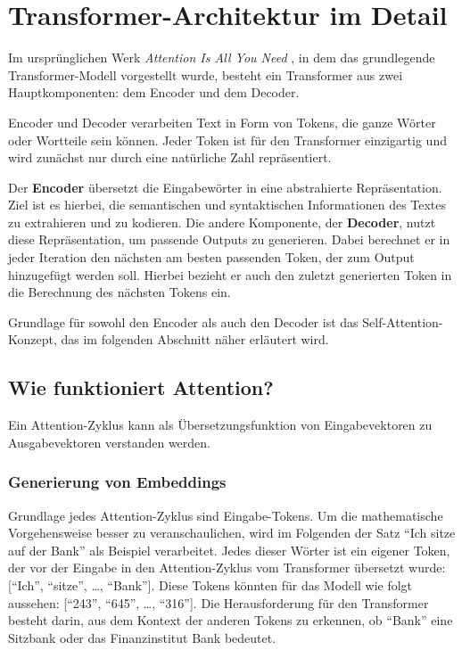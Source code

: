 \chapter{Transformer-Architektur im Detail}

Im ursprünglichen Werk \textit{Attention Is All You Need} , in dem das grundlegende Transformer-Modell vorgestellt wurde, besteht ein Transformer aus zwei Hauptkomponenten: 
dem Encoder und dem Decoder.

Encoder und Decoder verarbeiten Text in Form von Tokens, die ganze Wörter oder Wortteile sein können. 
Jeder Token ist für den Transformer einzigartig und wird zunächst nur durch eine natürliche Zahl repräsentiert.

Der \textbf{Encoder} übersetzt die Eingabewörter in eine abstrahierte Repräsentation.  
Ziel ist es hierbei, die semantischen und syntaktischen Informationen des Textes zu extrahieren und zu kodieren.  
Die andere Komponente, der \textbf{Decoder}, nutzt diese Repräsentation, um passende Outputs zu generieren. 
Dabei berechnet er in jeder Iteration den nächsten am besten passenden Token, der zum Output hinzugefügt werden soll. 
Hierbei bezieht er auch den zuletzt generierten Token in die Berechnung des nächsten Tokens ein.

Grundlage für sowohl den Encoder als auch den Decoder ist das Self-Attention-Konzept, das im folgenden Abschnitt näher erläutert wird.

\section{Wie funktioniert Attention?}

Ein Attention-Zyklus kann als Übersetzungsfunktion von Eingabevektoren zu Ausgabevektoren verstanden werden.

\subsection{Generierung von Embeddings}

Grundlage jedes Attention-Zyklus sind Eingabe-Tokens.  
Um die mathematische Vorgehensweise besser zu veranschaulichen, wird im Folgenden der Satz \enquote{Ich sitze auf der Bank} als Beispiel verarbeitet.
Jedes dieser Wörter ist ein eigener Token, der vor der Eingabe in den Attention-Zyklus vom Transformer übersetzt wurde:
[\enquote{Ich}, \enquote{sitze}, \dots, \enquote{Bank}].  
Diese Tokens könnten für das Modell wie folgt aussehen: [\enquote{243}, \enquote{645}, \dots, \enquote{316}].
Die Herausforderung für den Transformer besteht darin, aus dem Kontext der anderen Tokens zu erkennen, ob \enquote{Bank} eine Sitzbank oder das Finanzinstitut Bank bedeutet.

